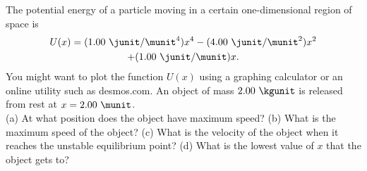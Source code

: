 The potential energy of a particle moving
in a certain one-dimensional region of space is
\begin{multline*}
  U(x) = (1.00\ \junit/\munit^4) x^4 - (4.00\ \junit/\munit^2) x^2 \\ + (1.00\ \junit/\munit) x.
\end{multline*}
You might want to plot the function $U(x)$ using
a graphing calculator or an online utility such as desmos.com.
An object of mass $2.00\ \kgunit$ is released from rest at
$x = 2.00\ \munit$. \\
%
(a) At what position does the object have maximum speed?\answercheck\hwendpart
%
(b) What is the maximum speed of the object?\answercheck\hwendpart
%
(c) What is the velocity of the object when it reaches the unstable equilibrium
point?\answercheck\hwendpart
%
(d) What is the lowest value of $x$ that the object gets to?\answercheck
